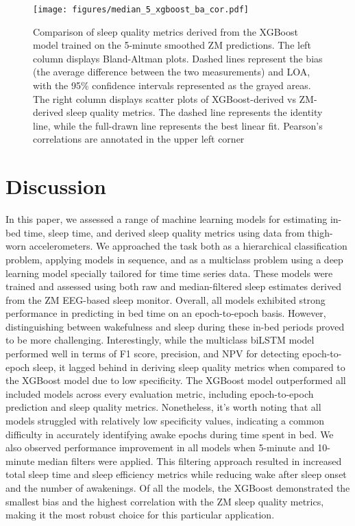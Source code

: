 \documentclass[
  10pt,
]{scrbook}
\begin{document}
\begin{figure}

{\centering \texttt{[image: figures/median\_5\_xgboost\_ba\_cor.pdf]}

}

\caption{\label{fig-xgb_ba_cor}Comparison of sleep quality metrics
derived from the XGBoost model trained on the 5-minute smoothed ZM
predictions. The left column displays Bland-Altman plots. Dashed lines
represent the bias (the average difference between the two measurements)
and LOA, with the 95\% confidence intervals represented as the grayed
areas. The right column displays scatter plots of XGBoost-derived vs
ZM-derived sleep quality metrics. The dashed line represents the
identity line, while the full-drawn line represents the best linear fit.
Pearson's correlations are annotated in the upper left corner}

\end{figure}

\hypertarget{discussion-2}{%
\section{Discussion}\label{discussion-2}}

In this paper, we assessed a range of machine learning models for
estimating in-bed time, sleep time, and derived sleep quality metrics
using data from thigh-worn accelerometers. We approached the task both
as a hierarchical classification problem, applying models in sequence,
and as a multiclass problem using a deep learning model specially
tailored for time time series data. These models were trained and
assessed using both raw and median-filtered sleep estimates derived from
the ZM EEG-based sleep monitor. Overall, all models exhibited strong
performance in predicting in bed time on an epoch-to-epoch basis.
However, distinguishing between wakefulness and sleep during these
in-bed periods proved to be more challenging. Interestingly, while the
multiclass biLSTM model performed well in terms of F1 score, precision,
and NPV for detecting epoch-to-epoch sleep, it lagged behind in deriving
sleep quality metrics when compared to the XGBoost model due to low
specificity. The XGBoost model outperformed all included models across
every evaluation metric, including epoch-to-epoch prediction and sleep
quality metrics. Nonetheless, it's worth noting that all models
struggled with relatively low specificity values, indicating a common
difficulty in accurately identifying awake epochs during time spent in
bed. We also observed performance improvement in all models when
5-minute and 10-minute median filters were applied. This filtering
approach resulted in increased total sleep time and sleep efficiency
metrics while reducing wake after sleep onset and the number of
awakenings. Of all the models, the XGBoost demonstrated the smallest
bias and the highest correlation with the ZM sleep quality metrics,
making it the most robust choice for this particular application.
\end{document}
